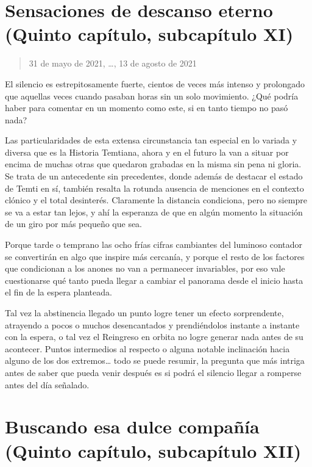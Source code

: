 \documentclass[
  spanish,
]{book}
\begin{document}
\hypertarget{sensaciones-de-descanso-eterno-quinto-capuxedtulo-subcapuxedtulo-xi}{%
\section{Sensaciones de descanso eterno (Quinto capítulo, subcapítulo XI)}\label{sensaciones-de-descanso-eterno-quinto-capuxedtulo-subcapuxedtulo-xi}}

\begin{quote}
31 de mayo de 2021, \ldots, 13 de agosto de 2021
\end{quote}

El silencio es estrepitosamente fuerte, cientos de veces más intenso y prolongado que aquellas veces cuando pasaban horas sin un solo movimiento. ¿Qué podría haber para comentar en un momento como este, si en tanto tiempo no pasó nada?

Las particularidades de esta extensa circunstancia tan especial en lo variada y diversa que es la Historia Temtiana, ahora y en el futuro la van a situar por encima de muchas otras que quedaron grabadas en la misma sin pena ni gloria. Se trata de un antecedente sin precedentes, donde además de destacar el estado de Temti en sí, también resalta la rotunda ausencia de menciones en el contexto clónico y el total desinterés. Claramente la distancia condiciona, pero no siempre se va a estar tan lejos, y ahí la esperanza de que en algún momento la situación de un giro por más pequeño que sea.

Porque tarde o temprano las ocho frías cifras cambiantes del luminoso contador se convertirán en algo que inspire más cercanía, y porque el resto de los factores que condicionan a los anones no van a permanecer invariables, por eso vale cuestionarse qué tanto pueda llegar a cambiar el panorama desde el inicio hasta el fin de la espera planteada.

Tal vez la abstinencia llegado un punto logre tener un efecto sorprendente, atrayendo a pocos o muchos desencantados y prendiéndolos instante a instante con la espera, o tal vez el Reingreso en orbita no logre generar nada antes de su acontecer. Puntos intermedios al respecto o alguna notable inclinación hacia alguno de los dos extremos\ldots{} todo se puede resumir, la pregunta que más intriga antes de saber que pueda venir después es si podrá el silencio llegar a romperse antes del día señalado.

\hypertarget{buscando-esa-dulce-compauxf1uxeda-quinto-capuxedtulo-subcapuxedtulo-xii}{%
\section{Buscando esa dulce compañía (Quinto capítulo, subcapítulo XII)}\label{buscando-esa-dulce-compauxf1uxeda-quinto-capuxedtulo-subcapuxedtulo-xii}}
\end{document}

